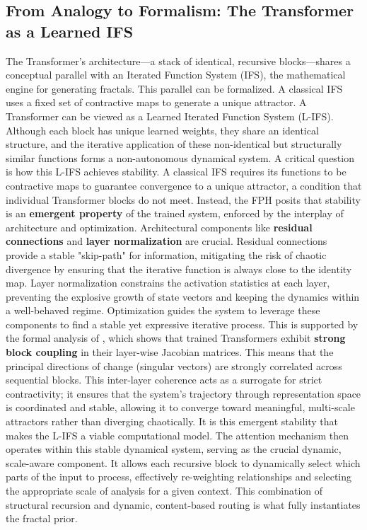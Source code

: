 \documentclass[11pt,a4paper]{article}
\begin{document}
\subsection{From Analogy to Formalism: The Transformer as a Learned IFS}
The Transformer's architecture—a stack of identical, recursive blocks—shares a conceptual parallel with an Iterated Function System (IFS), the mathematical engine for generating fractals. This parallel can be formalized. A classical IFS uses a fixed set of contractive maps to generate a unique attractor. A Transformer can be viewed as a Learned Iterated Function System (L-IFS). Although each block has unique learned weights, they share an identical structure, and the iterative application of these non-identical but structurally similar functions forms a non-autonomous dynamical system.
A critical question is how this L-IFS achieves stability. A classical IFS requires its functions to be contractive maps to guarantee convergence to a unique attractor, a condition that individual Transformer blocks do not meet. Instead, the FPH posits that stability is an \textbf{emergent property} of the trained system, enforced by the interplay of architecture and optimization. Architectural components like \textbf{residual connections} and \textbf{layer normalization} are crucial. Residual connections provide a stable "skip-path" for information, mitigating the risk of chaotic divergence by ensuring that the iterative function is always close to the identity map. Layer normalization constrains the activation statistics at each layer, preventing the explosive growth of state vectors and keeping the dynamics within a well-behaved regime. Optimization guides the system to leverage these components to find a stable yet expressive iterative process. This is supported by the formal analysis of \cite{noci2024transformer}, which shows that trained Transformers exhibit \textbf{strong block coupling} in their layer-wise Jacobian matrices. This means that the principal directions of change (singular vectors) are strongly correlated across sequential blocks. This inter-layer coherence acts as a surrogate for strict contractivity; it ensures that the system's trajectory through representation space is coordinated and stable, allowing it to converge toward meaningful, multi-scale attractors rather than diverging chaotically. It is this emergent stability that makes the L-IFS a viable computational model. The attention mechanism then operates within this stable dynamical system, serving as the crucial dynamic, scale-aware component. It allows each recursive block to dynamically select which parts of the input to process, effectively re-weighting relationships and selecting the appropriate scale of analysis for a given context. This combination of structural recursion and dynamic, content-based routing is what fully instantiates the fractal prior.
\end{document}
